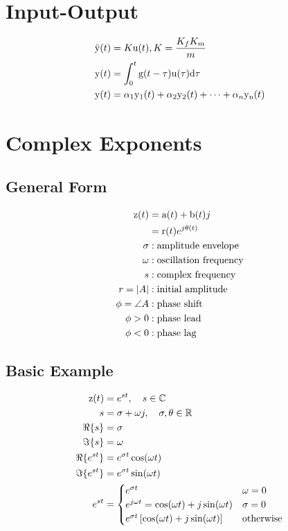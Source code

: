 \documentclass[8pt]{extarticle}
\begin{document}
\begin{multicols*}{3}

\section*{Input-Output}
\begin{align*}
    \func{\ddot{y}}[t] &= K \func{u}[t], K = \frac{K_{f}K_{m}}{m} \\
    \func{y}[t] &= \intdef{0}{t}{\func{g}[t-\tau]\func{u}[\tau]}{\tau} \\
    \func{y}[t] &= \alpha_{1}\func{y_{1}}[t]+\alpha_{2}\func{y_{2}}[t]+\cdots+\alpha_{n}\func{y_{n}}[t]
\end{align*}

\section*{Complex Exponents}
\subsection*{General Form}
\begin{align*}
    \func{z}[t] &= \func{a}[t]+\func{b}[t]j \\
                &= \func{r}[t]e^{j\func{\theta}[t]} \\
    \sigma &: \text{amplitude envelope} \\
    \omega &: \text{oscillation frequency} \\
    s &: \text{complex frequency} \\
    r = |A| &: \text{initial amplitude} \\
    \phi = \angle A &: \text{phase shift} \\
    \phi > 0 &: \text{phase lead} \\
    \phi < 0 &: \text{phase lag}
\end{align*}

\subsection*{Basic Example}
\begin{align*}
    \func{z}[t] &= e^{st}, \quad s \in \mathbb{C} \\
    s &= \sigma + \omega j, \quad \sigma, \theta \in \mathbb{R} \\
    \Re{s} &= \sigma \\
    \Im{s} &= \omega \\
    \Re{e^{st}} &= e^{\sigma t} \cos{\omega t} \\
    \Im{e^{st}} &= e^{\sigma t} \sin{\omega t} \\
    e^{st} &= \begin{cases}
        e^{\sigma t} & \omega = 0 \\
        e^{j \omega t} = \cos{\omega t} + j \sin{\omega t} & \sigma = 0 \\
        e^{\sigma t} \left[\cos{\omega t}+j\sin{\omega t}\right] & \text{otherwise}
    \end{cases}
\end{align*}


\end{multicols*}
\end{document}
